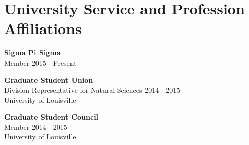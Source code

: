 

\section*{University Service and Profession Affiliations}



\smallskip
\LeftRight
{
	\textbf{Sigma Pi Sigma}\\
	Member
}
{
	2015 - Present
}




\smallskip
\LeftRight
{
	\textbf{Graduate Student Union}\\
	Division Representative for Natural Sciences
}
{
	2014 - 2015\\
	University of Louisville
}




\smallskip
\LeftRight
{
	\textbf{Graduate Student Council}\\
	Member
}
{
	2014 - 2015\\
	University of Louisville
}
